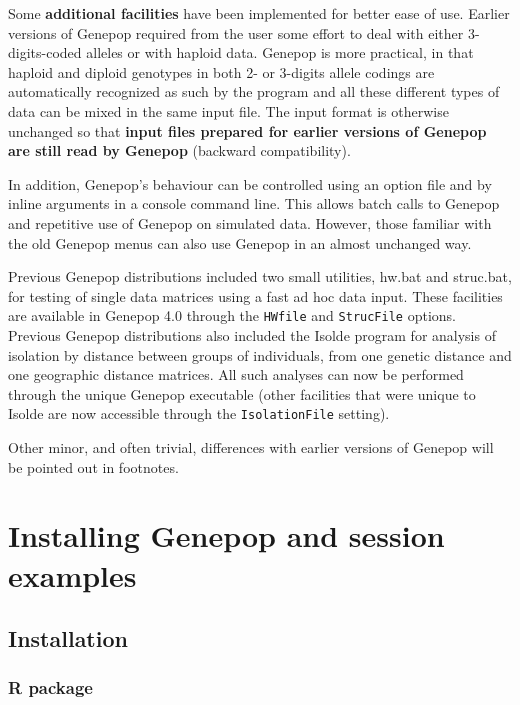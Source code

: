 \documentclass[12pt,]{book}
\begin{document}
Some \textbf{additional facilities} have been implemented for better
ease of use. Earlier versions of Genepop required from the user some
effort to deal with either 3-digits-coded 
alleles or with haploid data. Genepop is more practical, in that haploid
 and diploid genotypes in both 2- or 3-digits allele
codings are automatically recognized as such by the program and all
these different types of data can be mixed in the same input file. The
input format is otherwise unchanged so that \textbf{input files prepared
for earlier versions of Genepop are still read by Genepop} (backward
compatibility).

In addition, Genepop's behaviour can be controlled using an option file
and by inline arguments in a console command line. This allows batch
calls to Genepop and repetitive use of Genepop on simulated data.
However, those familiar with the old Genepop menus can also use Genepop
in an almost unchanged way.

Previous Genepop distributions included two small utilities, hw.bat
 and struc.bat,  for testing of
single data matrices using a fast ad hoc data input. These facilities
are available in Genepop 4.0 through the \texttt{HWfile}
 and \texttt{StrucFile} options.
 Previous Genepop distributions also included
the Isolde  program for analysis of isolation by
distance between groups of individuals, from one genetic distance and
one geographic distance matrices. All such analyses can now be performed
through the unique Genepop executable (other facilities that were unique
to Isolde are now accessible through the \texttt{IsolationFile}
setting).

Other minor, and often trivial, differences with earlier versions of
Genepop will be pointed out in footnotes.

\chapter{Installing Genepop and session
examples}\label{installing-genepop-and-session-examples}

\section{Installation}\label{installation}

\subsection{R package}\label{r-package}
\end{document}
